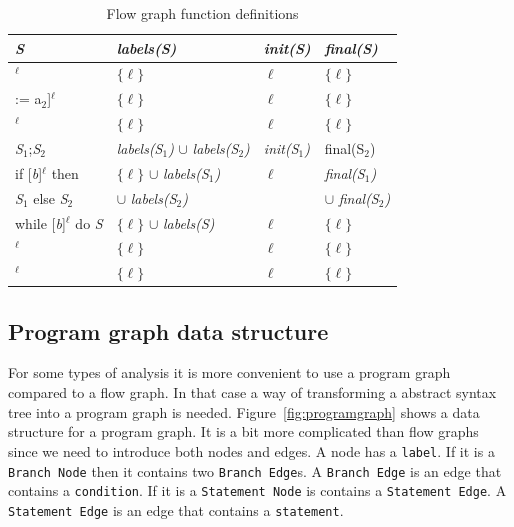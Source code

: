 \begin{table}
\begin{tabular}{| l | l | l | l |}
\hline
\textsl{S}                              & \textsl{labels(S)}                                    & \textsl{init(S)}     & \textsl{final(S)} \\ 
\hline
[x := a]$^\ell$                         & $\{\ell\}$                                            &$\ell$                & $\{\ell\}$ \\
\hline
[int A[a$_1$] := a$_2$]$^\ell$          & $\{\ell\}$                                            &$\ell$                & $\{\ell\}$ \\
\hline
[skip]$^\ell$                           & $\{\ell\}$                                            &$\ell$                & $\{\ell\}$ \\
\hline
\textsl{S}$_1$;\textsl{S}$_2$           & \textsl{labels(S$_1$)} $\cup$ \textsl{labels(S$_2$)}  & \textsl{init(S$_1$)} & {final(S$_2$)} \\ %
\hline
if [\textsl{b}]$^\ell$ then             & $\{\ell\}$ $\cup$  \textsl{labels(S$_1$)}             &$\ell$                & \textsl{final(S$_1$)} \\
  \textsl{S}$_1$ else \textsl{S}$_2$    &  $\cup$ \textsl{labels(S$_2$)}                        &                      & $\cup$ \textsl{final(S$_2$)} \\
\hline
while [\textsl{b}]$^\ell$ do \textsl{S} & $\{\ell\}$ $\cup$  \textsl{labels(S)}                 &$\ell$                & $\{\ell\}$ \\
\hline
[read \textsl{x}]$^\ell$                & $\{\ell\}$                                            &$\ell$                & $\{\ell\}$ \\
\hline
[write \textsl{x}]$^\ell$               & $\{\ell\}$                                            &$\ell$                & $\{\ell\}$ \\
\hline 
\end{tabular}
\centering
\caption{Flow graph function definitions}
\label{table:flow_graph_functions}
\end{table}

\subsection{Program graph data structure}
For some types of analysis it is more convenient to use a program graph compared to a flow graph. In that case a way of transforming a abstract syntax tree into a program graph is needed. Figure~\ref{fig:programgraph} shows a data structure for a program graph. It is a bit more complicated than flow graphs since we need to introduce both nodes and edges. A node has a \texttt{label}. If it is a \texttt{Branch Node} then it contains two \texttt{Branch Edge}s. A \texttt{Branch Edge} is an edge that contains a \texttt{condition}. If it is a \texttt{Statement Node} is contains a \texttt{Statement Edge}. A \texttt{Statement Edge} is an edge that contains a \texttt{statement}.

